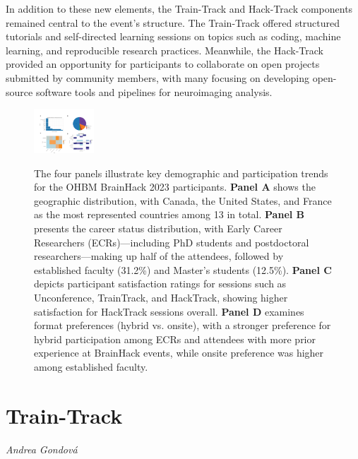 \documentclass{article}
\newcommand\coordinator[1]{\begin{flushleft}\small\textit{#1}\end{flushleft}}
\begin{document}
In addition to these new elements, the Train-Track and Hack-Track components remained central to the event's structure.
The Train-Track offered structured tutorials and self-directed learning sessions on topics such as coding, machine learning, and reproducible research practices.
Meanwhile, the Hack-Track provided an opportunity for participants to collaborate on open projects submitted by community members, with many focusing on developing open-source software tools and pipelines for neuroimaging analysis.

\begin{figure}[h]
    \centering
    \includegraphics[width=0.2\textwidth]{images/demographics.png}
    \label{fig:demographics}
    \caption{
        The four panels illustrate key demographic and participation trends for the OHBM BrainHack 2023 participants.
        \textbf{Panel A} shows the geographic distribution, with Canada, the United States, and France as the most represented countries among 13 in total.
        \textbf{Panel B} presents the career status distribution, with Early Career Researchers (ECRs)—including PhD students and postdoctoral researchers—making up half of the attendees, followed by established faculty (31.2\%) and Master's students (12.5\%).
        \textbf{Panel C} depicts participant satisfaction ratings for sessions such as Unconference, TrainTrack, and HackTrack, showing higher satisfaction for HackTrack sessions overall.
        \textbf{Panel D} examines format preferences (hybrid vs. onsite), with a stronger preference for hybrid participation among ECRs and attendees with more prior experience at BrainHack events, while onsite preference was higher among established faculty.
    }
\end{figure}

\section{Train-Track}
\coordinator{Andrea Gondová}
\end{document}
